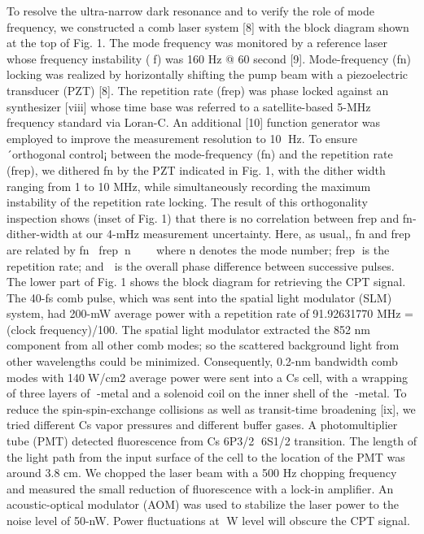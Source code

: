      To resolve the ultra-narrow dark resonance and to verify the role of mode frequency, we constructed a comb laser system [8] with the block diagram shown at the top of Fig. 1. The mode frequency was monitored by a reference laser whose frequency instability (f) was 160 Hz @ 60 second [9]. Mode-frequency (fn) locking was realized by horizontally shifting the pump beam with a piezoelectric transducer (PZT) [8]. The repetition rate (frep) was phase locked against an synthesizer [viii] whose time base was referred to a satellite-based 5-MHz frequency standard via Loran-C. An additional [10] function generator was employed to improve the measurement resolution to 10 Hz. To ensure ´orthogonal control¡ between the mode-frequency (fn) and the repetition rate (frep), we dithered fn by the PZT indicated in Fig. 1, with the dither width ranging from 1 to 10 MHz, while simultaneously recording the maximum instability of the repetition rate locking. The result of this orthogonality inspection shows (inset of Fig. 1) that there is no correlation between frep and fn-dither-width at our 4-mHz measurement uncertainty. Here, as usual,, fn and frep are related by fnfrepnwhere n denotes the mode number; frep is the repetition rate; and  is the overall phase difference between successive pulses. The lower part of Fig. 1 shows the block diagram for retrieving the CPT signal. The 40-fs comb pulse, which was sent into the spatial light modulator (SLM) system, had 200-mW average power with a repetition rate of 91.92631770 MHz = (clock frequency)/100. The spatial light modulator extracted the 852 nm component from all other comb modes; so the scattered background light from other wavelengths could be minimized. Consequently, 0.2-nm bandwidth comb modes with 140W/cm2 average power were sent into a Cs cell, with a wrapping of three layers of -metal and a solenoid coil on the inner shell of the -metal. To reduce the spin-spin-exchange collisions as well as transit-time broadening [ix], we tried different Cs vapor pressures and different buffer gases. A photomultiplier tube (PMT) detected fluorescence from Cs 6P3/2 6S1/2 transition. The length of the light path from the input surface of the cell to the location of the PMT was around 3.8 cm. We chopped the laser beam with a 500 Hz chopping frequency and measured the small reduction of fluorescence with a lock-in amplifier. An acoustic-optical modulator (AOM) was used to stabilize the laser power to the noise level of 50-nW. Power fluctuations at W level will obscure the CPT signal.

